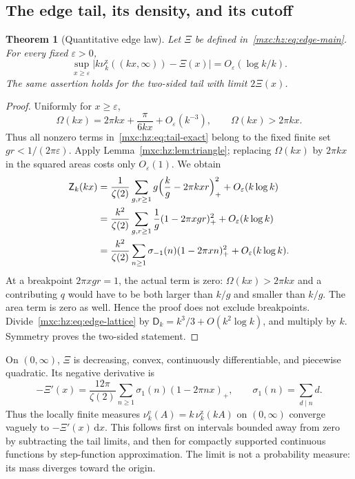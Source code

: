 \documentclass[11pt]{article}
\numberwithin{equation}{section}
\newtheorem{theorem}{Theorem}[section]
\theoremstyle{definition}
\theoremstyle{remark}
\newcommand{\dd}{\,\mathrm d}
\newcommand{\hznu}{\nu^{\mathrm z}}
\begin{document}
\subsection{The edge tail, its density, and its cutoff}

\begin{theorem}[Quantitative edge law]\label{mxc:hz:thm:edge}
Let $\Xi$ be defined in~\eqref{mxc:hz:eq:edge-main}. For every fixed
$\varepsilon>0$,
\begin{equation}\label{mxc:hz:eq:edge-uniform}
 \sup_{x\ge\varepsilon}
 \bigl|k\hznu_k((kx,\infty))-\Xi(x)\bigr|
 =O_\varepsilon(\log k/k).
\end{equation}
The same assertion holds for the two-sided tail with limit $2\Xi(x)$.
\end{theorem}

\begin{proof}
Uniformly for $x\ge\varepsilon$,
\[
 \Omega(kx)=2\pi kx+\frac{\pi}{6kx}+O_\varepsilon(k^{-3}),
 \qquad \Omega(kx)>2\pi kx.
\]
Thus all nonzero terms in~\eqref{mxc:hz:eq:tail-exact} belong to the fixed
finite set $gr<1/(2\pi\varepsilon)$. Apply
Lemma~\ref{mxc:hz:lem:triangle}; replacing $\Omega(kx)$ by $2\pi kx$ in the
squared areas costs only $O_\varepsilon(1)$. We obtain
\begin{align}
 \mathsf Z_k(kx)
 &=\frac1{\zeta(2)}\sum_{g,r\ge1}
       g\Bigl(\frac{k}{g}-2\pi kxr\Bigr)_+^2
       +O_\varepsilon(k\log k)\notag\\
 &=\frac{k^2}{\zeta(2)}\sum_{g,r\ge1}\frac1g(1-2\pi xgr)_+^2
       +O_\varepsilon(k\log k)\notag\\
 &=\frac{k^2}{\zeta(2)}\sum_{n\ge1}\sigma_{-1}(n)(1-2\pi xn)_+^2
       +O_\varepsilon(k\log k).\label{mxc:hz:eq:edge-lattice}
\end{align}
At a breakpoint $2\pi xgr=1$, the actual term is zero: $\Omega(kx)>2\pi kx$
and a contributing $q$ would have to be both larger than $k/g$ and smaller
than $k/g$. The area term is zero as well. Hence the proof does not
exclude breakpoints. Divide~\eqref{mxc:hz:eq:edge-lattice} by
$\mathsf D_k=k^3/3+O(k^2\log k)$, and multiply by $k$. Symmetry proves the
two-sided statement.
\end{proof}

On $(0,\infty)$, $\Xi$ is decreasing, convex, continuously differentiable,
and piecewise quadratic. Its negative derivative is
\begin{equation}\label{mxc:hz:eq:edge-density}
 -\Xi'(x)=\frac{12\pi}{\zeta(2)}\sum_{n\ge1}\sigma_1(n)(1-2\pi nx)_+,
 \qquad \sigma_1(n)=\sum_{d\mid n}d.
\end{equation}
Thus the locally finite measures $\nu^{\mathrm e}_k(A)=k\,\hznu_k(kA)$ on
$(0,\infty)$ converge vaguely to $-\Xi'(x)\dd x$. This follows first on
intervals bounded away from zero by subtracting the tail limits, and then
for compactly supported continuous functions by step-function
approximation. The limit is not a probability measure: its mass diverges
toward the origin.
\end{document}
